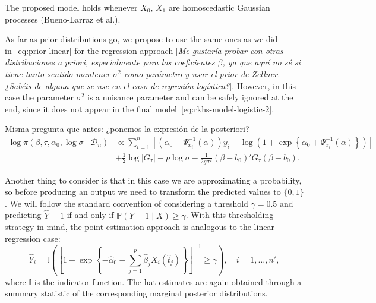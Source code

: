 \documentclass[ba]{imsart}
\numberwithin{equation}{section}
\theoremstyle{plain}
\newenvironment{comment}
{
\noindent \em \color{red}
}
{
\color{black}
}
\newcommand\incomment[1]{\color{red}[\textit{#1}]\color{black}}
\begin{document}
\begin{comment}
  The proposed model holds whenever \(X_0\), \(X_1\) are homoscedastic Gaussian processes (Bueno-Larraz et al.).
\end{comment}

As far as prior distributions go, we propose to use the same ones as we did in~\eqref{eq:prior-linear} for the regression approach \incomment{Me gustaría probar con otras distribuciones a priori, especialmente para los coeficientes \(\beta\), ya que aquí no sé si tiene tanto sentido mantener \(\sigma^2\) como parámetro y usar el prior de Zellner. ¿Sabéis de alguna que se use en el caso de regresión logística?}. However, in this case the parameter \(\sigma^2\) is a nuisance parameter and can be safely ignored at the end, since it does not appear in the final model~\eqref{eq:rkhs-model-logistic-2}.

\begin{comment}
  Misma pregunta que antes: ¿ponemos la expresión de la posteriori?
  \begin{align*}
\log \pi(\beta, \tau, \alpha_0, \log\sigma\mid \mathcal D_n) & \propto \sum_{i=1}^n \left[ \left(\alpha_0 + \Psi^{-1}_{x_i}(\alpha)\right)y_i - \log\left(1 + \exp\left\{\alpha_0 + \Psi_{x_i}^{-1}(\alpha)\right\}\right)\right]\\
\quad &+ \frac{1}{2}\log |G_\tau| - p\log \sigma -\frac{1}{2g\sigma^2} (\beta - b_0)'G_\tau(\beta - b_0).
\end{align*}

\end{comment}

Another thing to consider is that in this case we are approximating a probability, so before producing an output we need to transform the predicted values to \(\{0, 1\}\). We will follow the standard convention of considering a threshold \(\gamma = 0.5\) and predicting \(\hat Y=1\) if and only if \(\mathbb P(Y=1\mid X) \geq \gamma\). With this thresholding strategy in mind, the point estimation approach is analogous to the linear regression case:
\[
\hat Y_i = \mathbb I \left( \left[\displaystyle 1 + \exp\left\{-\hat\alpha_0 - \sum_{j=1}^p \hat\beta_j X_i(\hat t_j)\right\}\right]^{-1} \geq \gamma \right), \quad i=1,\dots,n',
\]
where \(\mathbb I\) is the indicator function. The hat estimates are again obtained through a summary statistic of the corresponding marginal posterior distributions.
\end{document}
